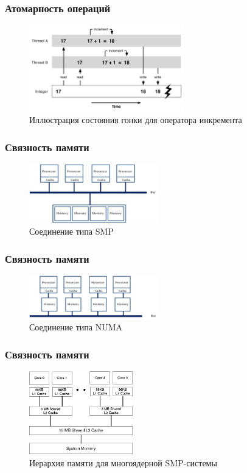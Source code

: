 \documentclass[aspectratio=169, pdf, 8pt, unicode]{beamer}
\begin{document}
\begin{frame}[fragile]
\frametitle{Атомарность операций}
\begin{figure}[H]
	  \centering
      \includegraphics[width=0.6\textwidth]{fig/race-condition-inc.png}
      \caption{Иллюстрация состояния гонки для оператора инкремента}
\end{figure}
\end{frame}

\begin{frame}[fragile]
\frametitle{Связность памяти}
\begin{figure}[H]
      \centering
      \includegraphics[width=0.5\textwidth]{fig/smp.png}
      \caption{Соединение типа SMP}
\end{figure}
\end{frame}

\begin{frame}[fragile]
\frametitle{Связность памяти}
\begin{figure}[H]
      \centering
      \includegraphics[width=0.5\textwidth]{fig/numa.jpg}
      \caption{Соединение типа NUMA}
\end{figure}
\end{frame}

\begin{frame}[fragile]
\frametitle{Связность памяти}
\begin{figure}[H]
      \centering
      \includegraphics[width=0.4\textwidth]{fig/memory-hierarchy.png}
      \caption{Иерархия памяти для многоядерной SMP-системы}
\end{figure}
\end{frame}
\end{document}
